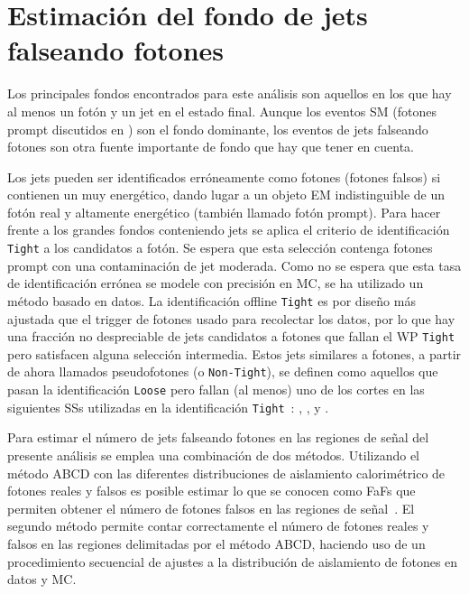 \section{Estimación del fondo de jets falseando fotones}
\label{sec:bkg:estimation}

Los principales fondos encontrados para este análisis son aquellos en los que hay al menos un fotón y un jet en el estado final. Aunque los eventos \ac{SM} \gammajet (fotones prompt discutidos en \Sect{\ref{subsec:theory:sm:prompt_photon}}) son el fondo dominante, los eventos de jets falseando fotones son otra fuente importante de fondo que hay que tener en cuenta.




Los jets pueden ser identificados erróneamente como fotones (fotones falsos) si contienen un \pizero muy energético, dando lugar a un objeto \ac{EM} indistinguible de un fotón real y altamente energético (también llamado fotón prompt). Para hacer frente a los grandes fondos conteniendo jets se aplica el criterio de identificación \texttt{Tight} a los candidatos a fotón. Se espera que esta selección contenga fotones prompt con una contaminación de jet moderada. Como no se espera que esta tasa de identificación errónea se modele con precisión en \ac{MC}, se ha utilizado un método basado en datos. La identificación offline \texttt{Tight} es por diseño más ajustada que el trigger de fotones usado para recolectar los datos, por lo que hay una fracción no despreciable de jets candidatos a fotones que fallan el \ac{WP} \texttt{Tight} pero satisfacen alguna selección intermedia. Estos jets similares a fotones, a partir de ahora llamados pseudofotones (o \texttt{Non-Tight}), se definen como aquellos que pasan la identificación \texttt{Loose} pero fallan (al menos) uno de los cortes en las siguientes \acp{SS} utilizadas en la identificación \texttt{Tight}~\cite{ATLAS-EGamma-Performance-2015-2017}: \wone, \fside, \deltae y \eratio.

Para estimar el número de jets falseando fotones en las regiones de señal del presente análisis se emplea una combinación de dos métodos. Utilizando el método ABCD con las diferentes distribuciones de aislamiento calorimétrico de fotones reales y falsos es posible estimar lo que se conocen como \acp{FaF} que permiten obtener el número de fotones falsos en las regiones de señal~\cite{ATLAS-SUSY-PhotonMetX-13TeV,ATLAS-SUSY-PhotonMetX-13TeV-NOTE,ATLAS-SUSY-PhotonJetMet-13TeV,ATLAS-SUSY-PhotonJetMet-13TeV-NOTE}. El segundo método permite contar correctamente el número de fotones reales y falsos en las regiones delimitadas por el método ABCD, haciendo uso de un procedimiento secuencial de ajustes a la distribución de aislamiento de fotones en datos y \ac{MC}.

